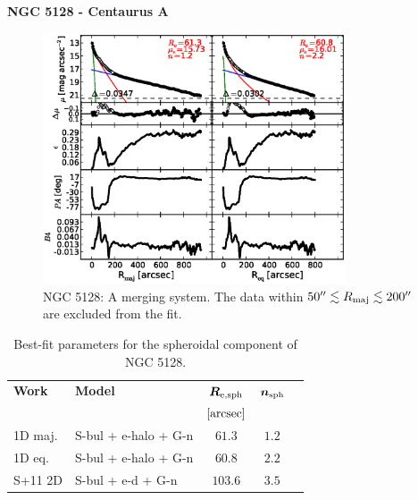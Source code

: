 \documentclass[preprint2]{emulateapj}
\newcommand{\fitfigurewidth}{0.8\textwidth}
\begin{document}
  \clearpage\newpage\noindent

  {\bf NGC 5128 - Centaurus A \\}

  \begin{figure}[h]
  \begin{center}
  \includegraphics[width=\fitfigurewidth]{images/n5128_1Dfit.eps}
  \caption{NGC 5128: 
  A merging system. 
  The data within $50'' \lesssim R_{\rm maj} \lesssim 200''$ are excluded from the fit.}
  \end{center}
  \end{figure}

  \begin{table}[h]
  \small
  \caption{Best-fit parameters for the spheroidal component of NGC 5128.}
  \begin{center}
  \begin{tabular}{llccc}
  \hline
  {\bf Work} & {\bf Model}   & $\bm R_{\rm e,sph}$    & $\bm n_{\rm sph}$ \\
    &  &  $[\rm arcsec]$ & \\
  \hline
  1D maj. & S-bul + e-halo + G-n & $61.3$  &  $1.2$ \\
  1D eq.  & S-bul + e-halo + G-n & $60.8$  &  $2.2$ \\
  \hline
  S+11 2D         & S-bul + e-d + G-n    & $103.6$  &  $3.5$ \\
  \hline
  \end{tabular}
  \end{center}
  \label{tab:n5128}
  \end{table}
\end{document}
